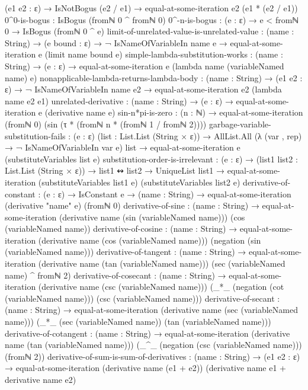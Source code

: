 \documentclass{report}
\begin{document}
\begin{code}
      (e1 e2 : ε) →
      IsNotBogus (e2 / e1) →
      equal-at-some-iteration e2 (e1 * (e2 / e1))
    0^0-is-bogus : IsBogus (fromℕ 0 ^ fromℕ 0)
    0^-n-is-bogus : (e : ε) → e < fromℕ 0 → IsBogus (fromℕ 0 ^ e)
    limit-of-unrelated-value-is-unrelated-value :
      (name : String) →
      (e bound : ε) →
      ¬ IsNameOfVariableIn name e →
      equal-at-some-iteration e (limit name bound e)
    simple-lambda-substitution-works :
      (name : String) →
      (e : ε) →
      equal-at-some-iteration e (lambda name (variableNamed name) e)
    nonapplicable-lambda-returns-lambda-body :
      (name : String) →
      (e1 e2 : ε) →
      ¬ IsNameOfVariableIn name e2 →
      equal-at-some-iteration e2 (lambda name e2 e1)
    unrelated-derivative :
      (name : String) →
      (e : ε) →
      equal-at-some-iteration e (derivative name e)
    sin-n*pi-is-zero :
      (n : ℕ) →
      equal-at-some-iteration (fromℕ 0)
                              (sin (τ * (fromℕ n * (fromℕ 1 / fromℕ 2))))
    garbage-variable-substitution-fails :
      (e : ε)
      (list : List.List (String × ε)) →
      AllList.All (λ (var , rep) → ¬ IsNameOfVariableIn var e)
                  list →
      equal-at-some-iteration e (substituteVariables list e)
    substitution-order-is-irrelevant :
      (e : ε) →
      (list1 list2 : List.List (String × ε)) →
      list1 ↭ list2 →
      UniqueList list1 →
      equal-at-some-iteration (substituteVariables list1 e)
                              (substituteVariables list2 e)
    derivative-of-constant :
      (e : ε) →
      IsConstant e →
      (name : String) →
      equal-at-some-iteration (derivative "name" e) (fromℕ 0)
    derivative-of-sine :
      (name : String) →
      equal-at-some-iteration (derivative name (sin (variableNamed name)))
                              (cos (variableNamed name))
    derivative-of-cosine :
      (name : String) →
      equal-at-some-iteration (derivative name (cos (variableNamed name)))
                              (negation (sin (variableNamed name)))
    derivative-of-tangent :
      (name : String) →
      equal-at-some-iteration (derivative name (tan (variableNamed name)))
                              (sec (variableNamed name) ^ fromℕ 2)
    derivative-of-cosecant :
      (name : String) →
      equal-at-some-iteration (derivative name (csc (variableNamed name)))
                              (_*_ (negation (cot (variableNamed name)))
                                   (csc (variableNamed name)))
    derivative-of-secant :
      (name : String) →
      equal-at-some-iteration (derivative name (sec (variableNamed name)))
                              (_*_ (sec (variableNamed name))
                                   (tan (variableNamed name)))
    derivative-of-cotangent :
      (name : String) →
      equal-at-some-iteration (derivative name (tan (variableNamed name)))
                              (_^_ (negation (csc (variableNamed name)))
                                   (fromℕ 2))
    derivative-of-sum-is-sum-of-derivatives :
      (name : String) →
      (e1 e2 : ε) →
      equal-at-some-iteration (derivative name (e1 + e2))
                              (derivative name e1 + derivative name e2)


\end{code}
\end{document}
